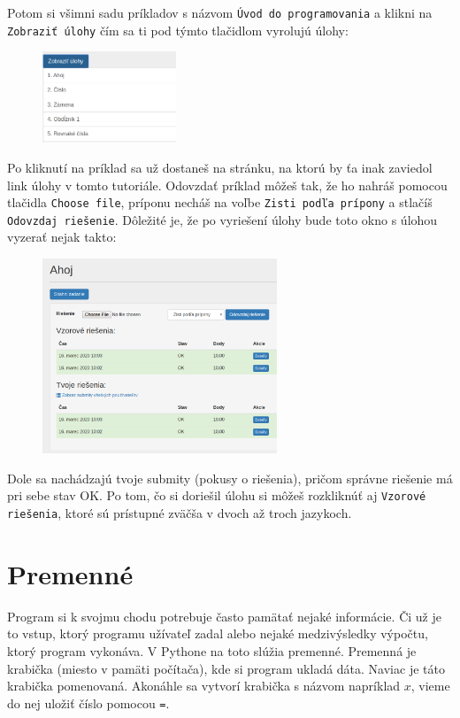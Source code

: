 \documentclass{article}
\begin{document}
Potom si všimni sadu príkladov s názvom \texttt{Úvod do programovania} a klikni na \texttt{Zobraziť úlohy} čím sa ti pod týmto tlačidlom vyrolujú úlohy:

\begin{figure}[h]
\includegraphics[width=4cm]{zoznam}
\centering
\end{figure}

Po kliknutí na príklad sa už dostaneš na stránku, na ktorú by ťa inak zaviedol link úlohy v tomto tutoriále. Odovzdať príklad môžeš tak, že ho nahráš pomocou tlačidla \texttt{Choose file}, príponu necháš na voľbe \texttt{Zisti podľa prípony} a stlačíš \texttt{Odovzdaj riešenie}. Dôležité je, že po vyriešení úlohy bude toto okno s úlohou vyzerať nejak takto:

\begin{figure}[h]
\includegraphics[width=7cm]{vyriesene}
\centering
\end{figure}

Dole sa nachádzajú tvoje submity (pokusy o riešenia), pričom správne riešenie má pri sebe stav OK. Po tom, čo si doriešil úlohu si môžeš rozkliknúť aj \texttt{Vzorové riešenia}, ktoré sú prístupné zväčša v dvoch až troch jazykoch.

\section{Premenné}

Program si k svojmu chodu potrebuje často pamätať nejaké informácie. Či už je to vstup, ktorý programu užívateľ zadal alebo nejaké medzivýsledky výpočtu, ktorý program vykonáva. V Pythone na toto slúžia premenné. Premenná je krabička (miesto v pamäti počítača), kde si program ukladá dáta. Naviac je táto krabička pomenovaná. Akonáhle sa vytvorí krabička s názvom napríklad $x$, vieme do nej uložiť číslo pomocou \texttt{=}.
\end{document}
